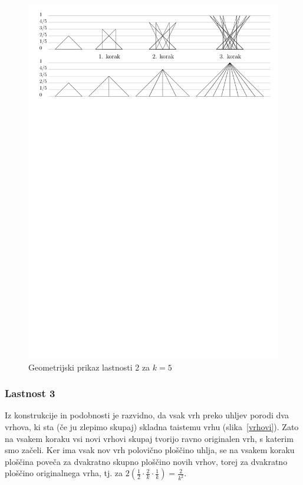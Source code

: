 \documentclass[a4paper, 12pt]{article}
\begin{document}
\begin{figure}[h!]
    \centering
    \includegraphics[width=\textwidth]{ipe_slike/lastnost2.pdf}
    \caption{Geometrijski prikaz lastnosti 2 za $ k = 5 $}
    \label{lastnost2}
\end{figure}


\subsubsection*{Lastnost 3}

Iz konstrukcije in podobnosti je razvidno, da vsak vrh preko uhljev porodi dva vrhova, ki sta (če ju zlepimo skupaj) skladna taistemu vrhu (slika~\ref{vrhovi}). Zato na vsakem koraku vsi novi vrhovi skupaj tvorijo ravno originalen vrh, s katerim smo začeli. Ker ima vsak nov vrh polovično ploščino uhlja, se na vsakem koraku ploščina poveča za dvakratno skupno ploščino novih vrhov, torej za dvakratno ploščino originalnega vrha, tj. za $ 2 \left( \frac{1}{2} \cdot \frac{2}{k} \cdot \frac{1}{k} \right) = \frac{2}{k^2} $.
\end{document}
